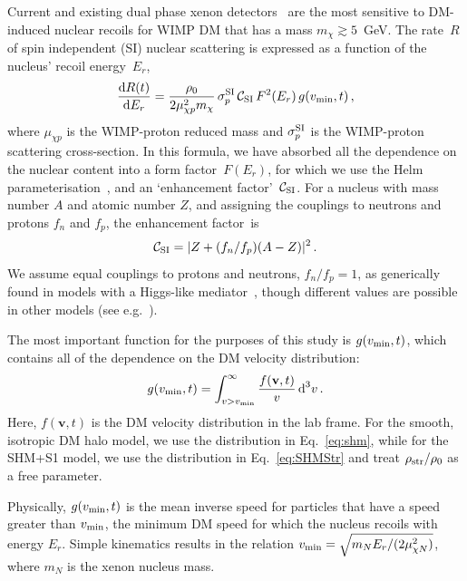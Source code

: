 \documentclass[prd,10pt,twocolumn,showpacs,nofootinbib,aps,superscriptaddress,preprintnumbers]{revtex4-1}
\newcommand{\vmin}{v_{\rm min}}
\begin{document}
Current and existing dual phase xenon detectors~\cite{Chepel:2012sj} are the most
sensitive to DM-induced nuclear recoils for WIMP DM that has a mass $m_\chi \gtrsim 5$~GeV.
The rate~$R$ of spin independent (SI) nuclear scattering is expressed as a function of the nucleus'
recoil energy~$E_r$,
%
\begin{equation}\label{eq:finaleventrate}
 \frac{\textrm{d}R(t)}{\textrm{d}E_r} = \frac{\rho_0}{2\mu_{\chi p}^2 m_\chi} \,\sigma^{\rm SI}_p \, \mathcal{C}_\textrm{SI} \,F^2(E_r)  \, g(\vmin,t) \, ,
\end{equation}
%
where $\mu_{\chi p}$ is the WIMP-proton reduced mass and $\sigma^{\rm SI}_p$ is the WIMP-proton scattering cross-section. In this formula,
we have absorbed all the dependence on the nuclear content into a
form factor~$F(E_r)$, for which we use the Helm parameterisation~\cite{Vietze:2014vsa}, and an `enhancement factor'~$\mathcal{C}_{\rm SI}$. 
For a nucleus with mass number $A$ and atomic number $Z$, and assigning
the couplings to neutrons and protons $f_n$ and $f_p$, the enhancement factor~is
 \begin{equation}\label{eq:CSI}
 \mathcal{C}_{\rm SI} = | Z + (f_n/f_p)(A-Z)|^2 \, .
\end{equation}
We assume equal couplings to protons and neutrons, $f_n/f_p = 1$, as
generically found in models with a Higgs-like mediator~\cite{Hoferichter:2017olk},
though different values are possible in other models (see e.g.~\cite{Frandsen:2011cg}).
%

The most important function for the purposes of this study is $g(\vmin,t)$,
which contains all of the dependence on the DM velocity distribution:
 \begin{equation}\label{eq:gvmin}
g(v_{\rm min},t) = \int_{v>\vmin}^\infty \frac{f(\textbf{v},t)}{v} \, \textrm{d}^3 v \, .
 \end{equation}
 Here, $f(\textbf{v},t)$ is the DM velocity distribution in the lab frame. For the smooth, isotropic DM halo model,
 we use the distribution in Eq.~\eqref{eq:shm}, while for the SHM+S1 model, we use the distribution in Eq.~\eqref{eq:SHMStr}
 and treat $\rho_{\rm str}/\rho_0$ as a free parameter.
 
Physically, $g(\vmin,t)$ is the mean inverse speed for particles 
that have a speed greater than $\vmin$, the minimum DM speed 
for which the nucleus recoils with energy $E_r$. Simple kinematics 
results in the relation $\vmin = \sqrt{m_N E_r/ (2 \mu^2_{\chi N})}$, where $m_N$ is the xenon nucleus mass.
\end{document}
